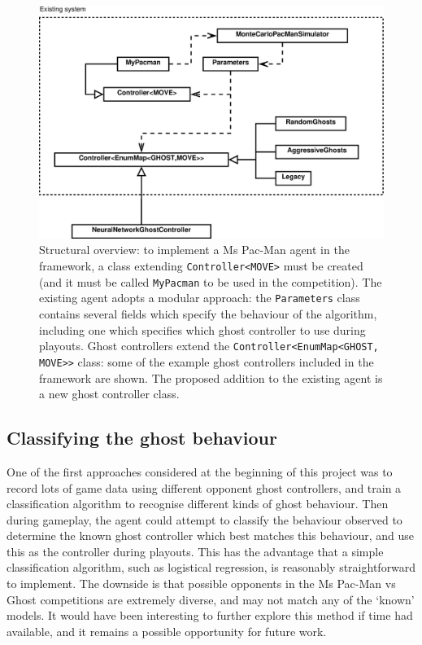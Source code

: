\begin{figure}
\includegraphics[width=\linewidth]{diagrams/proposed}
\caption[Structural overview]{Structural overview: to implement a Ms Pac-Man agent in the framework, a class extending {\tt Controller<MOVE>} must be created (and it must be called {\tt MyPacman} to be used in the competition).  The existing agent adopts a modular approach: the {\tt Parameters} class contains several fields which specify the behaviour of the algorithm, including one which specifies which ghost controller to use during playouts.  Ghost controllers extend the {\tt Controller<EnumMap<GHOST, MOVE>>} class: some of the example ghost controllers included in the framework are shown.  The proposed addition to the existing agent is a new ghost controller class.}
\label{fig:proposed}
\end{figure}

\subsection{Classifying the ghost behaviour}

One of the first approaches considered at the beginning of this project was to record lots of game data using different opponent ghost controllers, and train a classification algorithm to recognise different kinds of ghost behaviour.  Then during gameplay, the agent could attempt to classify the behaviour observed to determine the known ghost controller which best matches this behaviour, and use this as the controller during playouts.  This has the advantage that a simple classification algorithm, such as logistical regression, is reasonably straightforward to implement.  The downside is that possible opponents in the Ms Pac-Man vs Ghost competitions are extremely diverse, and may not match any of the `known' models.  It would have been interesting to further explore this method if time had available, and it remains a possible opportunity for future work.

